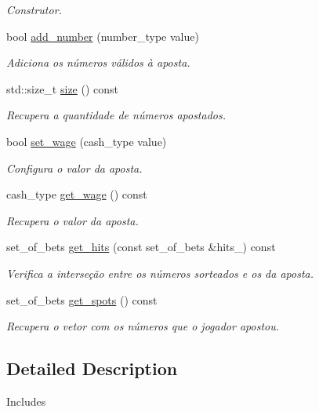 \begin{DoxyCompactItemize}
\begin{DoxyCompactList}\small\item\em Construtor. \end{DoxyCompactList}\item 
bool \hyperlink{classKenoBet_a4440293a7c5d12f7aca64cc639928ffe}{add\+\_\+number} (number\+\_\+type value)
\begin{DoxyCompactList}\small\item\em Adiciona os números válidos à aposta. \end{DoxyCompactList}\item 
std\+::size\+\_\+t \hyperlink{classKenoBet_a1f634c6e62646072edb7457e865568d7}{size} () const 
\begin{DoxyCompactList}\small\item\em Recupera a quantidade de números apostados. \end{DoxyCompactList}\item 
bool \hyperlink{classKenoBet_a1f713deb524c305c65649781d4210fec}{set\+\_\+wage} (cash\+\_\+type value)
\begin{DoxyCompactList}\small\item\em Configura o valor da aposta. \end{DoxyCompactList}\item 
cash\+\_\+type \hyperlink{classKenoBet_ac3650e4d42059ae5bf0e4de659648ee5}{get\+\_\+wage} () const 
\begin{DoxyCompactList}\small\item\em Recupera o valor da aposta. \end{DoxyCompactList}\item 
set\+\_\+of\+\_\+bets \hyperlink{classKenoBet_ac592f4662e2c26f9c256b43b7ed465b6}{get\+\_\+hits} (const set\+\_\+of\+\_\+bets \&hits\+\_\+) const 
\begin{DoxyCompactList}\small\item\em Verifica a interseção entre os números sorteados e os da aposta. \end{DoxyCompactList}\item 
set\+\_\+of\+\_\+bets \hyperlink{classKenoBet_a034adcea5d032a5ced4ae5a5fc85972c}{get\+\_\+spots} () const 
\begin{DoxyCompactList}\small\item\em Recupera o vetor com os números que o jogador apostou. \end{DoxyCompactList}\end{DoxyCompactItemize}


\subsection{Detailed Description}
Includes 

